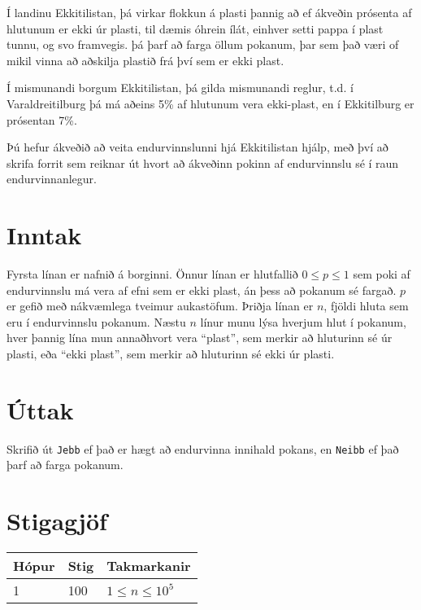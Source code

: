 
Í landinu Ekkitilistan, þá virkar flokkun á plasti þannig að ef ákveðin prósenta af hlutunum er ekki úr plasti, til dæmis óhrein ílát, einhver setti pappa í plast tunnu, og svo framvegis. þá þarf að farga öllum pokanum, þar sem það væri of mikil vinna að aðskilja plastið frá því sem er ekki plast.

Í mismunandi borgum Ekkitilistan, þá gilda mismunandi reglur, t.d. í Varaldreitilburg þá má aðeins 5\% af hlutunum vera ekki-plast, en í Ekkitilburg er prósentan 7\%.

Þú hefur ákveðið að veita endurvinnslunni hjá Ekkitilistan hjálp, með því að skrifa forrit sem reiknar út hvort að ákveðinn pokinn af endurvinnslu sé í raun endurvinnanlegur.

\section*{Inntak}
Fyrsta línan er nafnið á borginni.
Önnur línan er hlutfallið $0 \leq p \leq 1$ sem poki af endurvinnslu má vera af efni sem er ekki plast, án þess að pokanum sé fargað. $p$ er gefið með nákvæmlega tveimur aukastöfum.
Þriðja línan er $n$, fjöldi hluta sem eru í endurvinnslu pokanum.
Næstu $n$ línur munu lýsa hverjum hlut í pokanum, hver þannig lína mun annaðhvort vera ``plast'', sem merkir að hluturinn sé úr plasti, eða ``ekki plast'', sem merkir að hluturinn sé ekki úr plasti.


\section*{Úttak}
Skrifið út \texttt{Jebb} ef það er hægt að endurvinna innihald pokans, en \texttt{Neibb} ef það þarf að farga pokanum.

\section*{Stigagjöf}
\begin{tabular}{|l|l|l|}
    \hline
    Hópur & Stig & Takmarkanir          \\ \hline
    1     & 100  & $1 \leq n \leq 10^5$ \\ \hline
\end{tabular}

